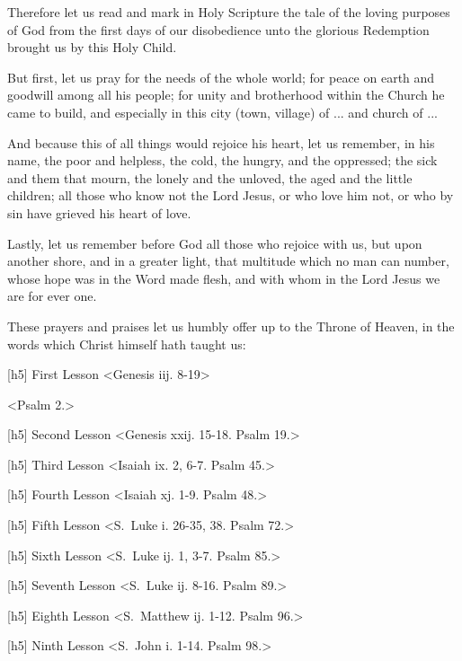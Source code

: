 
Therefore let us read and mark in Holy Scripture the tale of the loving purposes of God from the first days of our disobedience unto the glorious Redemption brought us by this Holy Child.

But first, let us pray for the needs of the whole world; for peace on earth and goodwill among all his people; for unity and brotherhood within the Church he came to build, and especially in this city (town, village) of ... and church of ...

And because this of all things would rejoice his heart, let us remember, in his name, the poor and helpless, the cold, the hungry, and the oppressed; the sick and them that mourn, the lonely and the unloved, the aged and the little children; all those who know not the Lord Jesus, or who love him not, or who by sin have grieved his heart of love.

Lastly, let us remember before God all those who rejoice with us, but upon another shore, and in a greater light, that multitude which no man can number, whose hope was in the Word made flesh, and with whom in the Lord Jesus we are for ever one.

These prayers and praises let us humbly offer up to the Throne of Heaven, in the words which Christ himself hath taught us:



[h5] First Lesson
<{Genesis iij. 8-19}>

<Psalm 2.>
\begin{multicols}{2}{
[h5] Second Lesson
<{Genesis xxij. 15-18.} Psalm 19.>

[h5] Third Lesson
<{Isaiah ix. 2, 6-7.} Psalm 45.>

[h5] Fourth Lesson
<{Isaiah xj. 1-9.} Psalm 48.>

[h5] Fifth Lesson
<{S.\ Luke i. 26-35, 38.} Psalm 72.>

[h5] Sixth Lesson
<{S.\ Luke ij. 1, 3-7.} Psalm 85.>

[h5] Seventh Lesson
<{S.\ Luke ij. 8-16.} Psalm 89.>

[h5] Eighth Lesson
<{S.\ Matthew ij. 1-12.} Psalm 96.>

[h5] Ninth Lesson
<{S.\ John i. 1-14.} Psalm 98.>
}\end{multicols}


